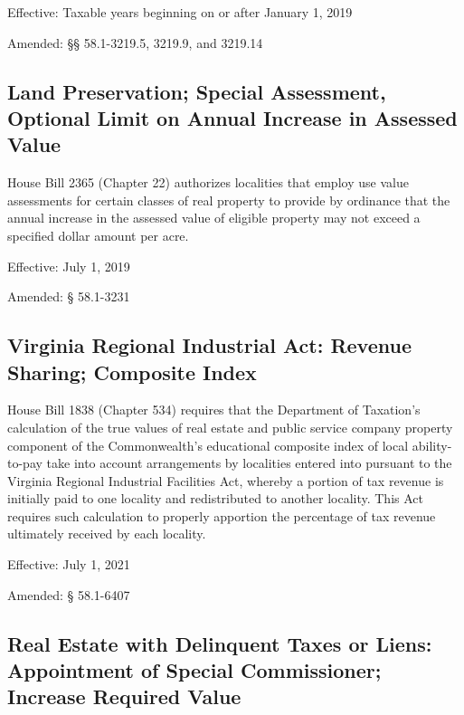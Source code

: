 \documentclass[
]{book}
\begin{document}
Effective: Taxable years beginning on or after January 1, 2019

Amended: §§ 58.1-3219.5, 3219.9, and 3219.14

\hypertarget{land-preservation-special-assessment-optional-limit-on-annual-increase-in-assessed-value}{%
\subsection{Land Preservation; Special Assessment, Optional Limit on Annual Increase in Assessed Value}\label{land-preservation-special-assessment-optional-limit-on-annual-increase-in-assessed-value}}

House Bill 2365 (Chapter 22) authorizes localities that employ use value assessments for certain classes of real property to provide by ordinance that the annual increase in the assessed value of eligible property may not exceed a specified dollar amount per acre.

Effective: July 1, 2019

Amended: § 58.1-3231

\hypertarget{virginia-regional-industrial-act-revenue-sharing-composite-index}{%
\subsection{Virginia Regional Industrial Act: Revenue Sharing; Composite Index}\label{virginia-regional-industrial-act-revenue-sharing-composite-index}}

House Bill 1838 (Chapter 534) requires that the Department of Taxation's calculation of the true values of real estate and public service company property component of the Commonwealth's educational composite index of local ability-to-pay take into account arrangements by localities entered into pursuant to the Virginia Regional Industrial Facilities Act, whereby a portion of tax revenue is initially paid to one locality and redistributed to another locality. This Act requires such calculation to properly apportion the percentage of tax revenue ultimately received by each locality.

Effective: July 1, 2021

Amended: § 58.1-6407

\hypertarget{real-estate-with-delinquent-taxes-or-liens-appointment-of-special-commissioner-increase-required-value}{%
\subsection{Real Estate with Delinquent Taxes or Liens: Appointment of Special Commissioner; Increase Required Value}\label{real-estate-with-delinquent-taxes-or-liens-appointment-of-special-commissioner-increase-required-value}}
\end{document}

